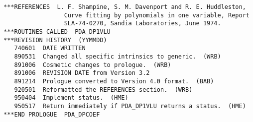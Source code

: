 \begin{verbatim}
***REFERENCES  L. F. Shampine, S. M. Davenport and R. E. Huddleston,
                 Curve fitting by polynomials in one variable, Report
                 SLA-74-0270, Sandia Laboratories, June 1974.
***ROUTINES CALLED  PDA_DP1VLU
***REVISION HISTORY  (YYMMDD)
   740601  DATE WRITTEN
   890531  Changed all specific intrinsics to generic.  (WRB)
   891006  Cosmetic changes to prologue.  (WRB)
   891006  REVISION DATE from Version 3.2
   891214  Prologue converted to Version 4.0 format.  (BAB)
   920501  Reformatted the REFERENCES section.  (WRB)
   950404  Implement status.  (HME)
   950517  Return immediately if PDA_DP1VLU returns a status.  (HME)
***END PROLOGUE  PDA_DPCOEF
\end{verbatim}



